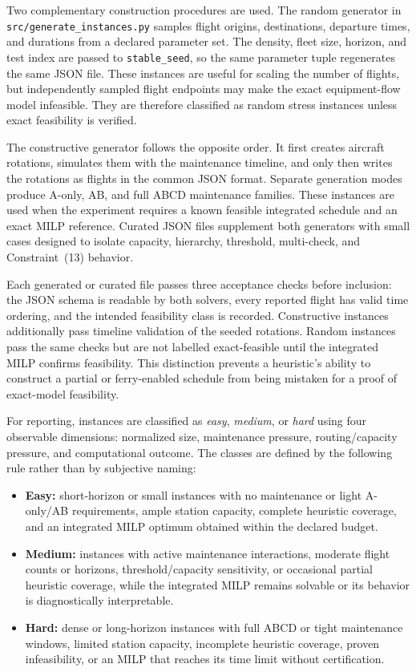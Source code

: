 Two complementary construction procedures are used. The random generator in
\texttt{src/generate\_instances.py} samples flight origins, destinations,
departure times, and durations from a declared parameter set. The density,
fleet size, horizon, and test index are passed to \texttt{stable\_seed}, so the
same parameter tuple regenerates the same JSON file. These instances are useful
for scaling the number of flights, but independently sampled flight endpoints
may make the exact equipment-flow model infeasible. They are therefore
classified as random stress instances unless exact feasibility is verified.

The constructive generator follows the opposite order. It first creates
aircraft rotations, simulates them with the maintenance timeline, and only then
writes the rotations as flights in the common JSON format. Separate generation
modes produce A-only, AB, and full ABCD maintenance families. These instances
are used when the experiment requires a known feasible integrated schedule and
an exact MILP reference. Curated JSON files supplement both generators with
small cases designed to isolate capacity, hierarchy, threshold, multi-check,
and Constraint~(13) behavior.

Each generated or curated file passes three acceptance checks before inclusion:
the JSON schema is readable by both solvers, every reported flight has valid
time ordering, and the intended feasibility class is recorded. Constructive
instances additionally pass timeline validation of the seeded rotations.
Random instances pass the same checks but are not labelled exact-feasible until
the integrated MILP confirms feasibility. This distinction prevents a
heuristic's ability to construct a partial or ferry-enabled schedule from being
mistaken for a proof of exact-model feasibility.

For reporting, instances are classified as \emph{easy}, \emph{medium}, or
\emph{hard} using four observable dimensions: normalized size, maintenance
pressure, routing/capacity pressure, and computational outcome. The classes are
defined by the following rule rather than by subjective naming:

\begin{itemize}
  \item \textbf{Easy:} short-horizon or small instances with no maintenance
  or light A-only/AB requirements, ample station capacity, complete heuristic
  coverage, and an integrated MILP optimum obtained within the declared
  budget.
  \item \textbf{Medium:} instances with active maintenance interactions,
  moderate flight counts or horizons, threshold/capacity sensitivity, or
  occasional partial heuristic coverage, while the integrated MILP remains
  solvable or its behavior is diagnostically interpretable.
  \item \textbf{Hard:} dense or long-horizon instances with full ABCD or tight
  maintenance windows, limited station capacity, incomplete heuristic
  coverage, proven infeasibility, or an MILP that reaches its time limit
  without certification.
\end{itemize}

